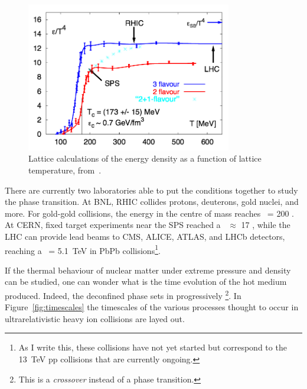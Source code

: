 \begin{figure}[h]
\begin{center}
  \includegraphics[width=0.8\textwidth]{Chapters/pQCD/phase_tc.png}
 \caption{Lattice calculations of the energy density as a function of
   lattice temperature, from~\cite{Karsch:2001cy}.}
 \label{fig:tc_lattice}
\end{center}
\end{figure}

There are currently two laboratories able to put the conditions
together to study the phase transition. At BNL,
RHIC collides protons, deuterons, gold nuclei, and more. For
gold-gold collisions, the energy in the centre of mass reaches
\snn\ = 200 \GeV. At CERN, fixed target experiments near the
SPS reached a \snn\ $\approx$ 17 \GeV, while
the LHC can provide lead beams to CMS, ALICE, ATLAS, and LHCb
detectors, reaching a \snn\ = 5.1~TeV in PbPb collisions\footnote{As I write this, these collisions have not yet started but correspond to the 13~TeV pp collisions that are currently ongoing.}.

If the thermal behaviour of nuclear matter under extreme pressure and
density can be studied, one can wonder what is the time evolution of
the hot medium produced. %
 Indeed, the deconfined phase sets
in progressively%
\footnote{This is a \textit{crossover} instead
of a phase transition.}. In Figure~\ref{fig:timescales} the
timescales of the various processes thought to occur in
ultrarelativistic heavy ion collisions are layed out.

